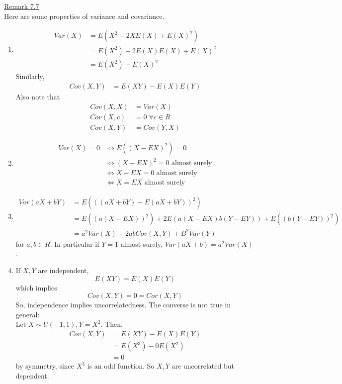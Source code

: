 \documentclass[10pt,letterpaper]{article}
\begin{document}
\pagebreak

\underline{Remark 7.7}\\

Here are some properties of variance and covariance.
			\begin{enumerate}
				\item
				\begin{align*}
					Var(X)&=E(X^2-2XE(X)+E(X)^2)\\
					&=E(X^2)-2E(X)E(X)+E(X)^2\\
					&=E(X^2)-E(X)^2
				\end{align*}
				Similarly,
				\begin{align*}
					Cov(X, Y)&=E(XY)-E(X)E(Y)
				\end{align*}
				Also note that
				\begin{align*}
					Cov(X, X)&=Var(X)\\
					Cov(X, c)&=0\;\forall c\in R\\
					Cov(X, Y)&=Cov(Y, X)
				\end{align*}
				
				\item
				\begin{align*}
					Var(X)=0&\iff E((X-EX)^2)=0\\
					&\iff(X-EX)^2=0\mbox{ almost surely}\\
					&\iff X-EX=0\mbox{ almost surely}\\
					&\iff X=EX\mbox{ almost surely}
				\end{align*}
				
				\item
				\begin{align*}
					Var(aX+bY)&=E(((aX+bY)-E(aX+bY))^2)\\
					&=E((a(X-EX))^2)+2E(a(X-EX)b(Y-EY))+E((b(Y-EY))^2)\\
					&=a^2Var(X)+2abCov(X, Y)+B^2Var(Y)
				\end{align*}
				for $a, b\in R$. In particular if $Y=1$ almost surely, $Var(aX+b)=a^2Var(X)$.
				
				\item If $X, Y$ are independent, $$E(XY)=E(X)E(Y)$$ which implies $$Cov(X, Y)=0=Cor(X, Y)$$
				So, independence implies uncorrelatedness. The converse is not true in general:\\
				
				Let $X\sim U(-1, 1), Y=X^2$. Then,\
				\begin{align*}
					Cov(X, Y)&=E(XY)-E(X)E(Y)\\
					&=E(X^3)-0E(X^2)\\
					&=0
				\end{align*}
				by symmetry, since $X^3$ is an odd function. So $X, Y$ are uncorrelated but dependent.
			\end{enumerate}
\end{document}

